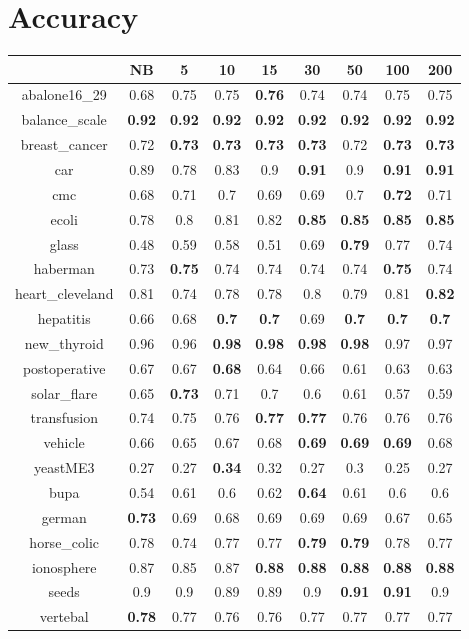 \documentclass{article}%
\begin{document}
%
\normalsize%
\section*{Accuracy}%
\begin{tabular}{c|cccccccc}%
\hline%
&NB&5&10&15&30&50&100&200\\%
\hline%
abalone16\_29&0.68&0.75&0.75&\textbf{0.76}&0.74&0.74&0.75&0.75\\%
\hline%
balance\_scale&\textbf{0.92}&\textbf{0.92}&\textbf{0.92}&\textbf{0.92}&\textbf{0.92}&\textbf{0.92}&\textbf{0.92}&\textbf{0.92}\\%
\hline%
breast\_cancer&0.72&\textbf{0.73}&\textbf{0.73}&\textbf{0.73}&\textbf{0.73}&0.72&\textbf{0.73}&\textbf{0.73}\\%
\hline%
car&0.89&0.78&0.83&0.9&\textbf{0.91}&0.9&\textbf{0.91}&\textbf{0.91}\\%
\hline%
cmc&0.68&0.71&0.7&0.69&0.69&0.7&\textbf{0.72}&0.71\\%
\hline%
ecoli&0.78&0.8&0.81&0.82&\textbf{0.85}&\textbf{0.85}&\textbf{0.85}&\textbf{0.85}\\%
\hline%
glass&0.48&0.59&0.58&0.51&0.69&\textbf{0.79}&0.77&0.74\\%
\hline%
haberman&0.73&\textbf{0.75}&0.74&0.74&0.74&0.74&\textbf{0.75}&0.74\\%
\hline%
heart\_cleveland&0.81&0.74&0.78&0.78&0.8&0.79&0.81&\textbf{0.82}\\%
\hline%
hepatitis&0.66&0.68&\textbf{0.7}&\textbf{0.7}&0.69&\textbf{0.7}&\textbf{0.7}&\textbf{0.7}\\%
\hline%
new\_thyroid&0.96&0.96&\textbf{0.98}&\textbf{0.98}&\textbf{0.98}&\textbf{0.98}&0.97&0.97\\%
\hline%
postoperative&0.67&0.67&\textbf{0.68}&0.64&0.66&0.61&0.63&0.63\\%
\hline%
solar\_flare&0.65&\textbf{0.73}&0.71&0.7&0.6&0.61&0.57&0.59\\%
\hline%
transfusion&0.74&0.75&0.76&\textbf{0.77}&\textbf{0.77}&0.76&0.76&0.76\\%
\hline%
vehicle&0.66&0.65&0.67&0.68&\textbf{0.69}&\textbf{0.69}&\textbf{0.69}&0.68\\%
\hline%
yeastME3&0.27&0.27&\textbf{0.34}&0.32&0.27&0.3&0.25&0.27\\%
\hline%
bupa&0.54&0.61&0.6&0.62&\textbf{0.64}&0.61&0.6&0.6\\%
\hline%
german&\textbf{0.73}&0.69&0.68&0.69&0.69&0.69&0.67&0.65\\%
\hline%
horse\_colic&0.78&0.74&0.77&0.77&\textbf{0.79}&\textbf{0.79}&0.78&0.77\\%
\hline%
ionosphere&0.87&0.85&0.87&\textbf{0.88}&\textbf{0.88}&\textbf{0.88}&\textbf{0.88}&\textbf{0.88}\\%
\hline%
seeds&0.9&0.9&0.89&0.89&0.9&\textbf{0.91}&\textbf{0.91}&0.9\\%
\hline%
vertebal&\textbf{0.78}&0.77&0.76&0.76&0.77&0.77&0.77&0.77\\%
\hline%
\end{tabular}
\end{document}
